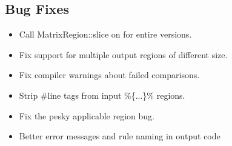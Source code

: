 \documentclass[11pt]{article}
\begin{document}
\subsection{Bug Fixes}
\begin{itemize}

\item Call MatrixRegion::slice on for entire versions.

\item Fix support for multiple output regions of different size.

\item Fix compiler warnings about failed comparisons.

\item Strip \#line tags from input \%\{...\}\% regions.

\item Fix the pesky applicable region bug.

\item Better error messages and rule naming in output code

\end{itemize}
\end{document}
